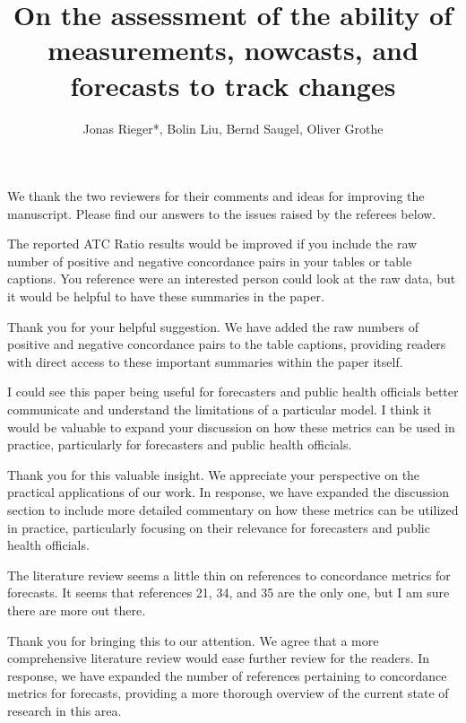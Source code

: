 \documentclass[12pt]{journalrebuttal}
\title{On the assessment of the ability of measurements, nowcasts, and forecasts to track changes}
\author{Jonas Rieger*, Bolin Liu, Bernd Saugel, Oliver Grothe}
\begin{document}
\maketitle

We thank the two reviewers for their comments and ideas for improving the manuscript. 
Please find our answers to the issues raised by the referees below.


\nextreviewer

\begin{revcomment}
	The reported ATC Ratio results would be improved if you include the raw number of positive and negative concordance pairs in your tables or table captions. You reference were an interested person could look at the raw data, but it would be helpful to have these summaries in the paper.
\end{revcomment}
\begin{response}
Thank you for your helpful suggestion. We have added the raw numbers of positive and negative concordance pairs to the table captions, providing readers with direct access to these important summaries within the paper itself.
\end{response}

\begin{revcomment}
I could see this paper being useful for forecasters and public health officials better communicate and understand the limitations of a particular model. I think it would be valuable to expand your discussion on how these metrics can be used in practice, particularly for forecasters and public health officials.
\end{revcomment}
\begin{response}
    Thank you for this valuable insight. We appreciate your perspective on the practical applications of our work. In response, we have expanded the discussion section to include more detailed commentary on how these metrics can be utilized in practice, particularly focusing on their relevance for forecasters and public health officials.
\end{response}

\begin{revcomment}
The literature review seems a little thin on references to concordance metrics for forecasts. It seems that references 21, 34, and 35 are the only one, but I am sure there are more out there.
\end{revcomment}
\begin{response}
    Thank you for bringing this to our attention. We agree that a more comprehensive literature review would ease further review for the readers. In response, we have expanded the number of references pertaining to concordance metrics for forecasts, providing a more thorough overview of the current state of research in this area.
\end{response}
\end{document}
